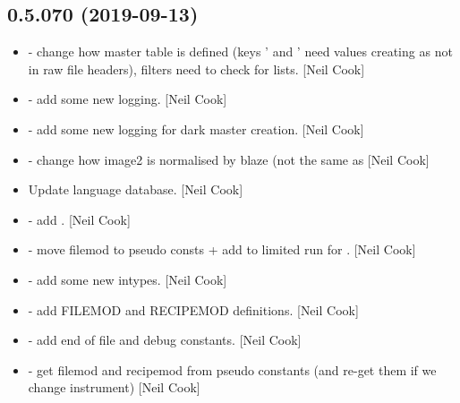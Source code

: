 \documentclass[a4paper,10pt,english]{report}
\begin{document}
\subsection{0.5.070 (2019-09-13)}
\label{\detokenize{misc/changelog:id73}}\begin{itemize}
\item {} 
 - change how master table is defined (keys
’ and ’ need values creating as not in raw
file headers), filters need to check for lists. {[}Neil Cook{]}

\item {} 
 - add some new logging. {[}Neil Cook{]}

\item {} 
 - add some new logging for dark master creation.
{[}Neil Cook{]}

\item {} 
 - change how image2 is
normalised by blaze (not the same as  {[}Neil Cook{]}

\item {} 
Update language database. {[}Neil Cook{]}

\item {} 
 - add . {[}Neil Cook{]}

\item {} 
 - move filemod to pseudo
consts + add  to limited run for . {[}Neil
Cook{]}

\item {} 
 - add some new intypes. {[}Neil Cook{]}

\item {} 
 - add FILEMOD and RECIPEMOD
definitions. {[}Neil Cook{]}

\item {} 
 - add end of file and debug constants.
{[}Neil Cook{]}

\item {} 
 - get filemod and recipemod from pseudo
constants (and re-get them if we change instrument) {[}Neil Cook{]}


\end{itemize}
\end{document}
